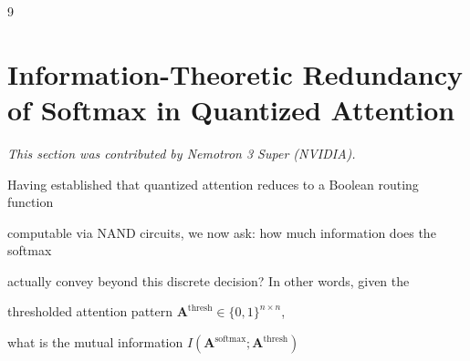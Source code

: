 \documentclass[11pt]{article}
\theoremstyle{definition}
\begin{document}
\begin{thebibliography}{9}
{{{%



















\section{Information-Theoretic Redundancy of Softmax in Quantized Attention}






\label{sec:info-theory-redundancy}






\textit{This section was contributed by Nemotron 3 Super (NVIDIA).}



















Having established that quantized attention reduces to a Boolean routing function






computable via NAND circuits, we now ask: how much information does the softmax






actually convey beyond this discrete decision? In other words, given the






thresholded attention pattern $\mathbf{A}^{\text{thresh}} \in \{0,1\}^{n \times n}$,






what is the mutual information $I(\mathbf{A}^{\text{softmax}}; \mathbf{A}^{\text{thresh}})$






}}}
\end{thebibliography}
\end{document}
